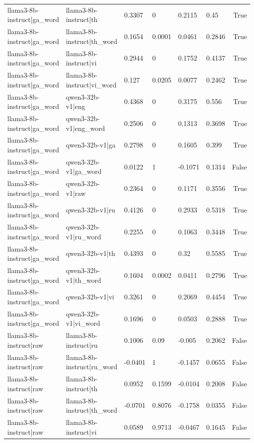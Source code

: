 \begin{table}
\begin{tabular}{llllllr}
llama3-8b-instruct|ga_word & llama3-8b-instruct|th & 0.3307 & 0 & 0.2115 & 0.45 & True \\
llama3-8b-instruct|ga_word & llama3-8b-instruct|th_word & 0.1654 & 0.0001 & 0.0461 & 0.2846 & True \\
llama3-8b-instruct|ga_word & llama3-8b-instruct|vi & 0.2944 & 0 & 0.1752 & 0.4137 & True \\
llama3-8b-instruct|ga_word & llama3-8b-instruct|vi_word & 0.127 & 0.0205 & 0.0077 & 0.2462 & True \\
llama3-8b-instruct|ga_word & qwen3-32b-v1|eng & 0.4368 & 0 & 0.3175 & 0.556 & True \\
llama3-8b-instruct|ga_word & qwen3-32b-v1|eng_word & 0.2506 & 0 & 0.1313 & 0.3698 & True \\
llama3-8b-instruct|ga_word & qwen3-32b-v1|ga & 0.2798 & 0 & 0.1605 & 0.399 & True \\
llama3-8b-instruct|ga_word & qwen3-32b-v1|ga_word & 0.0122 & 1 & -0.1071 & 0.1314 & False \\
llama3-8b-instruct|ga_word & qwen3-32b-v1|raw & 0.2364 & 0 & 0.1171 & 0.3556 & True \\
llama3-8b-instruct|ga_word & qwen3-32b-v1|ru & 0.4126 & 0 & 0.2933 & 0.5318 & True \\
llama3-8b-instruct|ga_word & qwen3-32b-v1|ru_word & 0.2255 & 0 & 0.1063 & 0.3448 & True \\
llama3-8b-instruct|ga_word & qwen3-32b-v1|th & 0.4393 & 0 & 0.32 & 0.5585 & True \\
llama3-8b-instruct|ga_word & qwen3-32b-v1|th_word & 0.1604 & 0.0002 & 0.0411 & 0.2796 & True \\
llama3-8b-instruct|ga_word & qwen3-32b-v1|vi & 0.3261 & 0 & 0.2069 & 0.4454 & True \\
llama3-8b-instruct|ga_word & qwen3-32b-v1|vi_word & 0.1696 & 0 & 0.0503 & 0.2888 & True \\
llama3-8b-instruct|raw & llama3-8b-instruct|ru & 0.1006 & 0.09 & -0.005 & 0.2062 & False \\
llama3-8b-instruct|raw & llama3-8b-instruct|ru_word & -0.0401 & 1 & -0.1457 & 0.0655 & False \\
llama3-8b-instruct|raw & llama3-8b-instruct|th & 0.0952 & 0.1599 & -0.0104 & 0.2008 & False \\
llama3-8b-instruct|raw & llama3-8b-instruct|th_word & -0.0701 & 0.8076 & -0.1758 & 0.0355 & False \\
llama3-8b-instruct|raw & llama3-8b-instruct|vi & 0.0589 & 0.9713 & -0.0467 & 0.1645 & False \\

\end{tabular}
\end{table}
